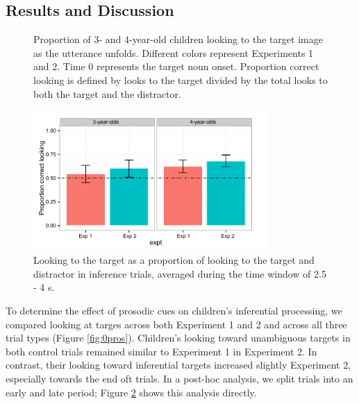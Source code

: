 \documentclass[10pt,letterpaper]{article}
\begin{document}
\subsection{Results and Discussion}

\begin{figure}[t]
	\caption{\label{fig:pros0} Proportion of 3- and 4-year-old children looking to the target image as the utterance unfolds. Different colors represent Experiments 1 and 2. Time 0 represents the target noun onset. Proportion correct looking is defined by looks to the target divided by the total looks to both the target and the distractor.}
\end{figure}

\begin{figure}[t]
\begin{center} 
\includegraphics[width=3.5in]{figures/simpimp0pros-bar_inf.pdf}
\caption{\label{fig:0prosbar} Looking to the target as a proportion of looking to the target and distractor in inference trials, averaged during the time window of 2.5 - 4 s.}
\end{center} 
\end{figure}

To determine the effect of prosodic cues on children's inferential processing, we compared looking at targes across both Experiment 1 and 2 and across all three trial types (Figure \ref{fig:0pros}). Children's looking toward unambiguous targets in both control trials remained similar to Experiment 1 in Experiment 2. In contrast, their looking toward inferential targets increased slightly Experiment 2, especially towards the end oft trials. In a post-hoc analysis, we split trials into an early and late period; Figure \ref{fig:0prosbar} shows this analysis directly. 
\end{document}
